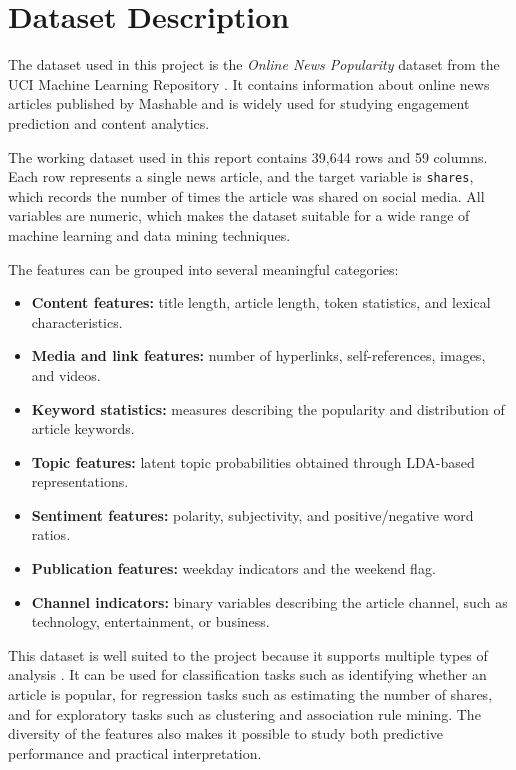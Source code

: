 \section{Dataset Description}

The dataset used in this project is the \textit{Online News Popularity} dataset from the UCI Machine Learning Repository \cite{fernandes2015dataset}. It contains information about online news articles published by Mashable and is widely used for studying engagement prediction and content analytics.

The working dataset used in this report contains 39,644 rows and 59 columns. Each row represents a single news article, and the target variable is \texttt{shares}, which records the number of times the article was shared on social media. All variables are numeric, which makes the dataset suitable for a wide range of machine learning and data mining techniques.

The features can be grouped into several meaningful categories:

\begin{itemize}[leftmargin=1.5em]
    \item \textbf{Content features:} title length, article length, token statistics, and lexical characteristics.
    \item \textbf{Media and link features:} number of hyperlinks, self-references, images, and videos.
    \item \textbf{Keyword statistics:} measures describing the popularity and distribution of article keywords.
    \item \textbf{Topic features:} latent topic probabilities obtained through LDA-based representations.
    \item \textbf{Sentiment features:} polarity, subjectivity, and positive/negative word ratios.
    \item \textbf{Publication features:} weekday indicators and the weekend flag.
    \item \textbf{Channel indicators:} binary variables describing the article channel, such as technology, entertainment, or business.
\end{itemize}

This dataset is well suited to the project because it supports multiple types of analysis \cite{han2011datamining}. It can be used for classification tasks such as identifying whether an article is popular, for regression tasks such as estimating the number of shares, and for exploratory tasks such as clustering and association rule mining. The diversity of the features also makes it possible to study both predictive performance and practical interpretation.
